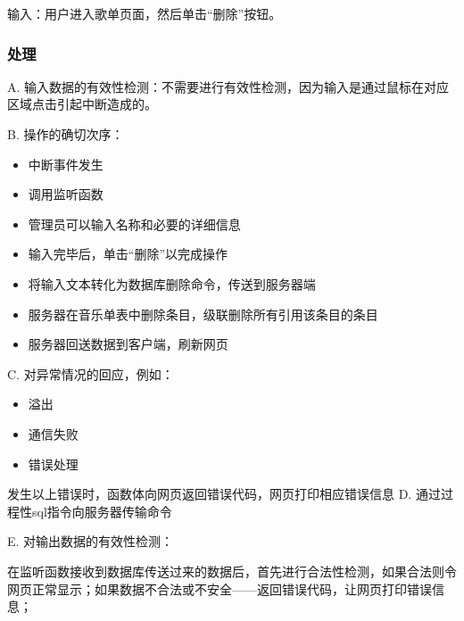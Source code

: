 				  输入：用户进入歌单页面，然后单击“删除”按钮。
				  
				  \subsubsection{处理}
				  
			   
				  
				  A. 输入数据的有效性检测：不需要进行有效性检测，因为输入是通过鼠标在对应区域点击引起中断造成的。
				  
				  B. 操作的确切次序：
				  \begin{adjustwidth}{2cm}{1cm}\qquad
					  \begin{itemize}
						  \item 中断事件发生
						  \item 调用监听函数
						  \item 管理员可以输入名称和必要的详细信息
						  \item 输入完毕后，单击“删除”以完成操作
						  \item 将输入文本转化为数据库删除命令，传送到服务器端
						  \item 服务器在音乐单表中删除条目，级联删除所有引用该条目的条目
						  \item 服务器回送数据到客户端，刷新网页
					  \end{itemize}		
				  \end{adjustwidth}
				   
				  
				  C. 对异常情况的回应，例如：
				  \begin{adjustwidth}{2cm}{1cm}\qquad
					  \begin{itemize}
						  \item 溢出
						  \item 通信失败
						  \item 错误处理
					  \end{itemize}		
				  \end{adjustwidth}
				  
					  发生以上错误时，函数体向网页返回错误代码，网页打印相应错误信息
				  D. 通过过程性sql指令向服务器传输命令
						  
				  E. 对输出数据的有效性检测：
				  
				  在监听函数接收到数据库传送过来的数据后，首先进行合法性检测，如果合法则令网页正常显示；如果数据不合法或不安全——返回错误代码，让网页打印错误信息；
				  
